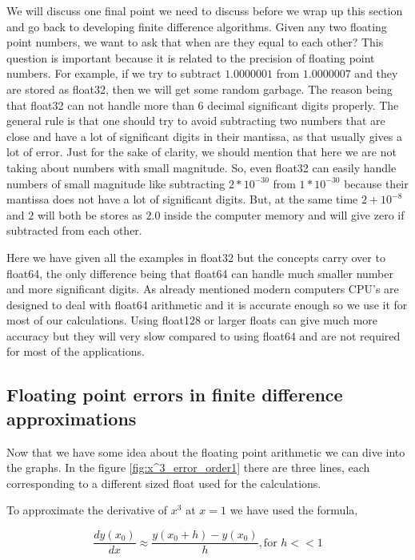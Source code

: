 We will discuss one final point we need to discuss before we wrap up this section and go back to developing finite difference algorithms. Given any two floating point numbers, we want to ask that when are they equal to each other?
This question is important because it is related to the precision of floating point numbers. For example, if we try to subtract $1.0000001$ from $1.0000007$ and they are stored as float32, then we will get some random garbage. The reason being that float32 can not handle more than 6 decimal significant digits properly.
The general rule is that one should try to avoid subtracting two numbers that are close and have a lot of significant digits in their mantissa, as that usually gives a lot of error.
Just for the sake of clarity, we should mention that here we are not taking about numbers with small magnitude. So, even float32 can easily handle numbers of small magnitude like subtracting $2*10^{-30}$ from $1*10^{-30}$ because their mantissa does not have a lot of significant digits. But, at the same time $2 + 10^{-8}$ and $2$ will both be stores as $2.0$ inside the computer memory and will give zero if subtracted from each other.


Here we have given all the examples in float32 but the concepts carry over to float64, the only difference being that float64 can handle much smaller number and more significant digits. As already mentioned modern computers CPU's are designed to deal with float64 arithmetic and it is accurate enough so we use it for most of our calculations. Using float128 or larger floats can give much more accuracy but they will very slow compared to using float64 and are not required for most of the applications.

\subsection{Floating point errors in finite difference approximations}

Now that we have some idea about the floating point arithmetic we can dive into the graphs.
In the figure \ref{fig:x^3_error_order1} there are three lines, each corresponding to a different sized float used for the calculations.

To approximate the derivative of $x^3$ at $x=1$ we have used the formula,

\begin{equation}
    \frac{dy(x_0)}{dx} \approx \frac{y(x_0 + h) - y(x_0)}{h} , \text{for } h << 1
\end{equation}\label{eq:first_order_2}

